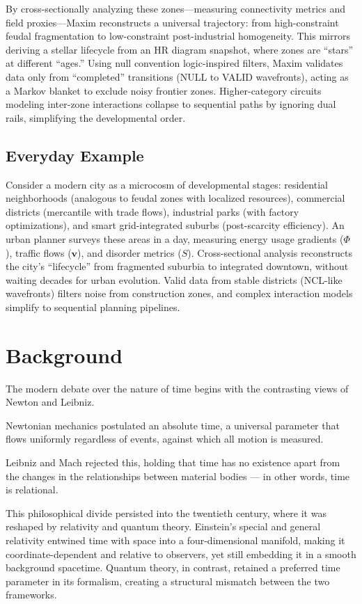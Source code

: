 \documentclass[11pt]{article}
\theoremstyle{plain}
\theoremstyle{definition}
\begin{document}
By cross-sectionally analyzing these zones—measuring connectivity metrics and field proxies—Maxim reconstructs a universal trajectory: from high-constraint feudal fragmentation to low-constraint post-industrial homogeneity. This mirrors deriving a stellar lifecycle from an HR diagram snapshot, where zones are “stars” at different “ages.” Using null convention logic-inspired filters, Maxim validates data only from “completed” transitions (NULL to VALID wavefronts), acting as a Markov blanket to exclude noisy frontier zones. Higher-category circuits modeling inter-zone interactions collapse to sequential paths by ignoring dual rails, simplifying the developmental order.

\subsection{Everyday Example}
Consider a modern city as a microcosm of developmental stages: residential neighborhoods (analogous to feudal zones with localized resources), commercial districts (mercantile with trade flows), industrial parks (with factory optimizations), and smart grid-integrated suburbs (post-scarcity efficiency). An urban planner surveys these areas in a day, measuring energy usage gradients ($\Phi$), traffic flows ($\mathbf{v}$), and disorder metrics ($S$). Cross-sectional analysis reconstructs the city’s “lifecycle” from fragmented suburbia to integrated downtown, without waiting decades for urban evolution. Valid data from stable districts (NCL-like wavefronts) filters noise from construction zones, and complex interaction models simplify to sequential planning pipelines.

\section{Background}

The modern debate over the nature of time begins with the contrasting views of Newton and Leibniz.

Newtonian mechanics postulated an absolute time, a universal parameter that flows uniformly regardless of events, against which all motion is measured.

Leibniz and Mach rejected this, holding that time has no existence apart from the changes in the relationships between material bodies — in other words, time is relational.

This philosophical divide persisted into the twentieth century, where it was reshaped by relativity and quantum theory. Einstein’s special and general relativity entwined time with space into a four-dimensional manifold, making it coordinate-dependent and relative to observers, yet still embedding it in a smooth background spacetime. Quantum theory, in contrast, retained a preferred time parameter in its formalism, creating a structural mismatch between the two frameworks.
\end{document}

